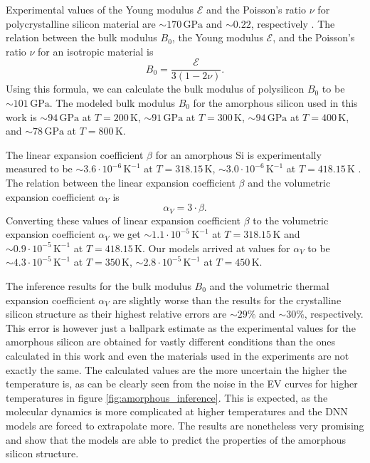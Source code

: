 Experimental values of the Young modulus $\mathcal{E}$ and the Poisson's ratio
$\nu$ for polycrystalline silicon material are $\sim 170 \, \mathrm{GPa}$ and
$\sim 0.22$, respectively \cite{Freund_Suresh_2003}. The relation between the
bulk modulus $B_0$, the Young modulus $\mathcal{E}$, and the Poisson's ratio
$\nu$ for an isotropic material is
\begin{equation}
  B_0 = \frac{\mathcal{E}}{3(1 - 2\nu)}.
\end{equation}
Using this formula, we can calculate the bulk modulus of polysilicon $B_0$ to
be $\sim 101 \, \mathrm{GPa}$. The modeled bulk modulus $B_0$ for the
amorphous silicon used in this work is
$\sim 94 \, \mathrm{GPa}$ at $T = 200 \, \mathrm{K}$,
$\sim 91 \, \mathrm{GPa}$ at $T = 300 \, \mathrm{K}$,
$\sim 94 \, \mathrm{GPa}$ at $T = 400 \, \mathrm{K}$,
and $\sim 78 \, \mathrm{GPa}$ at $T = 800 \, \mathrm{K}$.

The linear expansion coefficient $\beta$ for an amorphous Si is experimentally
measured to be $\sim 3.6 \cdot 10^{-6} \, \mathrm{K}^{-1}$ at
$T = 318.15 \, \mathrm{K}$, $\sim 3.0 \cdot 10^{-6} \, \mathrm{K}^{-1}$ at
$T = 418.15 \, \mathrm{K}$ \cite{TAKIMOTO2002314}. The relation between the
linear expansion coefficient $\beta$ and the volumetric expansion coefficient
$\alpha_V$ is
\begin{equation}
  \alpha_V = 3 \cdot \beta.
\end{equation}
Converting these values of linear expansion coefficient $\beta$ to the
volumetric expansion coefficient $\alpha_V$ we get
$\sim 1.1 \cdot 10^{-5} \, \mathrm{K}^{-1}$ at $T = 318.15 \, \mathrm{K}$ and
$\sim 0.9 \cdot 10^{-5} \, \mathrm{K}^{-1}$ at $T = 418.15 \, \mathrm{K}$.
Our models arrived at values for $\alpha_V$ to be
$\sim 4.3 \cdot 10^{-5} \, \mathrm{K}^{-1}$ at
$T = 350 \, \mathrm{K}$, $\sim 2.8 \cdot 10^{-5} \, \mathrm{K}^{-1}$ at
$T = 450 \, \mathrm{K}$.

The inference results for the bulk modulus $B_0$ and the volumetric thermal
expansion coefficient $\alpha_V$ are slightly worse than the results for the
crystalline silicon structure as their highest relative errors are
$\sim 29 \%$ and $\sim 30 \%$, respectively. This error is however just a
ballpark estimate as the experimental values for the amorphous silicon are
obtained for vastly different conditions than the ones calculated in this
work and even the materials used in the experiments are not exactly the same.
The calculated values are the more uncertain the higher the temperature is,
as can be clearly seen from the noise in the EV curves for higher temperatures
in figure \ref{fig:amorphous_inference}. This is expected, as the molecular
dynamics is more complicated at higher temperatures and the DNN models are
forced to extrapolate more. The results are nonetheless very promising and
show that the models are able to predict the properties of the amorphous
silicon structure.

